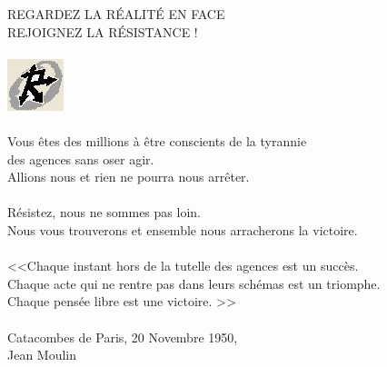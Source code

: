 \documentclass[11pt,twoside,a4paper]{article}
\begin{document}
\begin{center}
\begin{bfseries}
\begin{scshape}
\textcolor{titlered}{\LARGE REGARDEZ LA R{\'E}ALIT{\'E} EN FACE ~\\
REJOIGNEZ LA R{\'E}SISTANCE ! }~\\

~\\

\includegraphics{img/resistance_logo_greys_yellow.jpg}~\\

~\\

Vous {\^e}tes des millions {\`a} {\^e}tre conscients de la tyrannie ~\\
des agences sans oser agir. ~\\
Allions nous et rien ne pourra nous arr{\^e}ter.~\\

~\\

R{\'e}sistez, nous ne sommes pas loin. ~\\
Nous vous trouverons et ensemble nous arracherons la victoire.~\\

~\\

<<\textcolor{titlered}{Chaque instant hors de la tutelle des agences est un succ{\`e}s. ~\\
Chaque acte qui ne rentre pas dans leurs sch{\'e}mas est un triomphe. ~\\
Chaque pens{\'e}e libre est une victoire. }>>~\\

~\\

Catacombes de Paris, 20 Novembre 1950, ~\\
Jean Moulin~\\


\end{scshape} \end{bfseries} \end{center}
\end{document}
